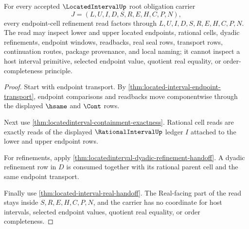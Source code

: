\begin{theorem}
\label{thm:locatedinterval-endpoint-cell-refinement-completeness}
For every accepted $\LocatedIntervalUp$ root obligation carrier
$$
J=(L,U,I,D,S,R,E,H,C,P,N),
$$
every endpoint-cell refinement read factors through $L,U,I,D,S,R,E,H,C,P,N$. The read may inspect lower and upper located endpoints, rational cells, dyadic refinements, endpoint windows, readbacks, real seal rows, transport rows, continuation routes, package provenance, and local naming; it cannot inspect a host interval primitive, selected endpoint value, quotient real equality, or order-completeness principle.
\end{theorem}
\begin{proof}
Start with endpoint transport. By \autoref{thm:located-interval-endpoint-transport}, endpoint comparisons and readbacks move componentwise through the displayed $\hsame$ and $\Cont$ rows.

Next use \autoref{thm:locatedinterval-containment-exactness}. Rational cell reads are exactly reads of the displayed $\RationalIntervalUp$ ledger $I$ attached to the lower and upper endpoint rows.

For refinements, apply \autoref{thm:locatedinterval-dyadic-refinement-handoff}. A dyadic refinement row in $D$ is consumed together with its rational parent cell and the same endpoint transport.

Finally use \autoref{thm:located-interval-real-handoff}. The Real-facing part of the read stays inside $S,R,E,H,C,P,N$, and the carrier has no coordinate for host intervals, selected endpoint values, quotient real equality, or order completeness.
\end{proof}

